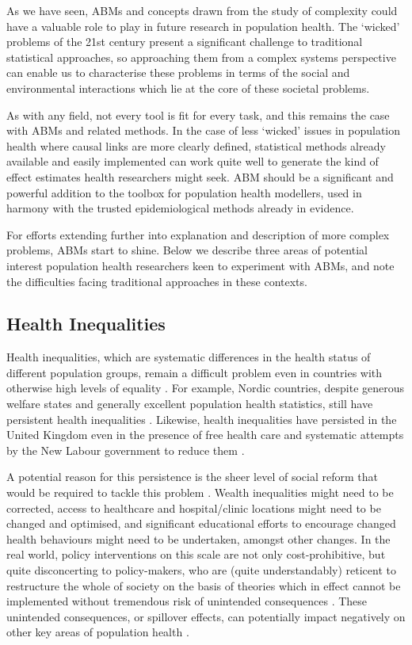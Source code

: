 \documentclass[review]{elsarticle}
\begin{document}
As we have seen, ABMs and concepts drawn from the study of complexity could have a valuable role to play in future research in population health.  The `wicked' problems of the 21st century present a significant challenge to traditional statistical approaches, so approaching them from a complex systems perspective can enable us to characterise these problems in terms of the social and environmental interactions which lie at the core of these societal problems.

As with any field, not every tool is fit for every task, and this remains the case with ABMs and related methods.  In the case of less `wicked' issues in population health where causal links are more clearly defined, statistical methods already available and easily implemented can work quite well to generate the kind of effect estimates health researchers might seek.  ABM should be a significant and powerful addition to the toolbox for population health modellers, used in harmony with the trusted epidemiological methods already in evidence.   

For efforts extending further into explanation and description of more complex problems, ABMs start to shine.  Below we describe three areas of potential interest population health researchers keen to experiment with ABMs, and note the difficulties facing traditional approaches in these contexts.

\subsection{Health Inequalities}

Health inequalities, which are systematic differences in the health status of different population groups, remain a difficult problem even in countries with otherwise high levels of equality \citep{bambra2011}. For example, Nordic countries, despite generous welfare states and generally excellent population health statistics, still have persistent health inequalities \citep{shaw2014}. Likewise, health inequalities have persisted in the United Kingdom even in the presence of free health care and systematic attempts by the New Labour government to reduce them \citep{mackenbach2011}.  

A potential reason for this persistence is the sheer level of social reform that would be required to tackle this problem \citep{mackenbach2011}.  Wealth inequalities might need to be corrected, access to healthcare and hospital/clinic locations might need to be changed and optimised, and significant educational efforts to encourage changed health behaviours might need to be undertaken, amongst other changes.  In the real world, policy interventions on this scale are not only cost-prohibitive, but quite disconcerting to policy-makers, who are (quite understandably) reticent to restructure the whole of society on the basis of theories which in effect cannot be implemented without tremendous risk of unintended consequences \citep{berkman2011}.  These unintended consequences, or spillover effects, can potentially impact negatively on other key areas of population health \citep{lorenc2014}. 
\end{document}
